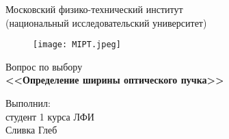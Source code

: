 \documentclass[a4paper,14pt]{extarticle}
\begin{document}
	\begin{titlepage}
		\begin{center}
			\large Московский физико-технический институт\\
			(национальный исследовательский университет)\\
			\vspace{1cm}
			\begin{figure}[h!]
				\centering
				\texttt{[image: MIPT.jpeg]}
				\label{fig:mpr}
			\end{figure}
			\vspace{3cm}
			\Large Вопрос по выбору \\
			\vspace{4cm}
			\textbf{\Huge <<Определение ширины оптического пучка>>}\\
		\end{center}
		
		\vspace{5cm}
		{\par \raggedleft \large Выполнил:\\ студент 1 курса ЛФИ \\ Сливка Глеб \par}
	\end{titlepage}
	\tableofcontents
	\newpage
	
	
	
\end{document}

